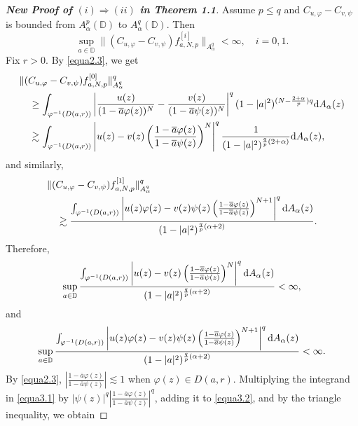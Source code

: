\documentclass[preprint,12pt,times]{elsarticle}
\theoremstyle{definition}
\theoremstyle{remark}
\numberwithin{equation}{section}
\begin{document}
\begin{proof}[{\bf New Proof of $(i)\Rightarrow(ii)$ in Theorem 1.1}]
Assume $p\leq q$ and $C_{u,\varphi}-C_{v,\psi}$ is bounded from $A_{\alpha}^p(\mathbb{D})$ to $A_{\alpha}^q(\mathbb{D})$. Then
\begin{equation*}
\sup_{a\in\mathbb{D}}\|(C_{u,\varphi}-C_{v,\psi})f_{a,N,p}^{[i]}\|_{A_{\alpha}^q}<\infty, \quad i=0,1.
\end{equation*}
Fix $r>0$. By \eqref{equa2.3}, we get
\begin{align*}
&\|(C_{u,\varphi}-C_{v,\psi})f_{a,N,p}^{[0]}\|_{A_{\alpha}^q}^q\\
&\quad \geq \int_{\varphi^{-1}(D(a,r))}\left|\frac{u(z)}{(1-\overline{a}\varphi(z))^N}-\frac{v(z)}{(1-\overline{a}\psi(z))^N}\right|^q(1-|a|^2)^{(N-\frac{2+\alpha}{p})q}{\rm d}A_{\alpha}(z)\\
&\quad \gtrsim\int_{\varphi^{-1}(D(a,r))}\left|u(z)-v(z)\left(\frac{1-\overline{a}\varphi(z)}{1-\overline{a}\psi(z)}\right)^N\right|^q\frac{1}{(1-|a|^2)^{\frac{q}{p}(2+\alpha)}}{\rm d}A_{\alpha}(z),
\end{align*}
and similarly,
\begin{align*}
&\|(C_{u,\varphi}-C_{v,\psi})f_{a,N,p}^{[1]}\|_{A_{\alpha}^q}^q\\
&\quad \gtrsim \frac{\int_{\varphi^{-1}(D(a,r))}\left|u(z)\varphi(z)-v(z)\psi(z)\left(\frac{1-\overline{a}\varphi(z)}{1-\overline{a}\psi(z)}\right)^{N+1}\right|^q{\rm d}A_{\alpha}(z)}{(1-|a|^2)^{\frac{q}{p}(\alpha+2)}}.
\end{align*}
Therefore,
\begin{equation}\label{equa3.1}
\sup_{a\in\mathbb{D}}\frac{\int_{\varphi^{-1}(D(a,r))}\left|u(z)-v(z)\left(\frac{1-\overline{a}\varphi(z)}{1-\overline{a}\psi(z)}\right)^N\right|^q{\rm d}A_{\alpha}(z)}{(1-|a|^2)^{\frac{q}{p}(\alpha+2)}}<\infty,
\end{equation}
and
\begin{equation}\label{equa3.2}
\sup_{a\in\mathbb{D}}\frac{\int_{\varphi^{-1}(D(a,r))}\left|u(z)\varphi(z)-v(z)\psi(z)\left(\frac{1-\overline{a}\varphi(z)}{1-\overline{a}\psi(z)}\right)^{N+1}\right|^q{\rm d}A_{\alpha}(z)}{(1-|a|^2)^{\frac{q}{p}(\alpha+2)}}<\infty.
\end{equation}
By \eqref{equa2.3}, $\left|\frac{1-\overline{a}\varphi(z)}{1-\overline{a}\psi(z)}\right|\lesssim 1$ when $\varphi(z)\in D(a,r)$. Multiplying the integrand in \eqref{equa3.1} by $|\psi(z)|^q\left|\frac{1-\overline{a}\varphi(z)}{1-\overline{a}\psi(z)}\right|^q$, adding it to \eqref{equa3.2}, and by the triangle inequality, we obtain

\end{proof}
\end{document}
